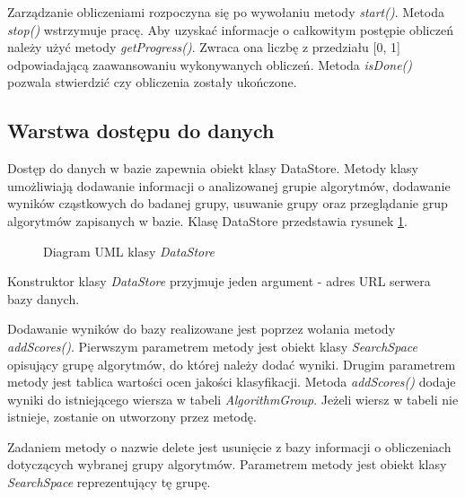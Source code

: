 \documentclass[../thesis.tex]{subfiles}
\begin{document}
Zarządzanie obliczeniami rozpoczyna się po wywołaniu metody \emph{start()}. Metoda \emph{stop()} wstrzymuje pracę. Aby uzyskać informacje o całkowitym postępie obliczeń należy użyć metody \emph{getProgress()}. Zwraca ona liczbę z przedziału [0, 1] odpowiadającą zaawansowaniu wykonywanych obliczeń. Metoda \emph{isDone()} pozwala stwierdzić czy obliczenia zostały ukończone.

\subsection{Warstwa dostępu do danych}

Dostęp do danych w bazie zapewnia obiekt klasy DataStore. Metody klasy umożliwiają dodawanie informacji o analizowanej grupie algorytmów, dodawanie wyników cząstkowych do badanej grupy, usuwanie grupy oraz przeglądanie grup algorytmów zapisanych w bazie. Klasę DataStore przedstawia rysunek \ref{proj:diagram_data_store}.

\begin{figure}[h]
\centering
{}
\caption{Diagram UML klasy \emph{DataStore}}
\label{proj:diagram_data_store}
\end{figure}

Konstruktor klasy \emph{DataStore} przyjmuje jeden argument - adres URL serwera bazy danych.

Dodawanie wyników do bazy realizowane jest poprzez wołania metody \emph{addScores()}. Pierwszym parametrem metody jest obiekt klasy \emph{SearchSpace} opisujący grupę algorytmów, do której należy dodać wyniki. Drugim parametrem metody jest tablica wartości ocen jakości klasyfikacji. Metoda \emph{addScores()} dodaje wyniki do istniejącego wiersza w tabeli \emph{AlgorithmGroup}. Jeżeli wiersz w tabeli nie istnieje, zostanie on utworzony przez metodę.

Zadaniem metody o nazwie delete jest usunięcie z bazy informacji o obliczeniach dotyczących wybranej grupy algorytmów. Parametrem metody jest obiekt klasy \emph{SearchSpace} reprezentujący tę grupę.
\end{document}
